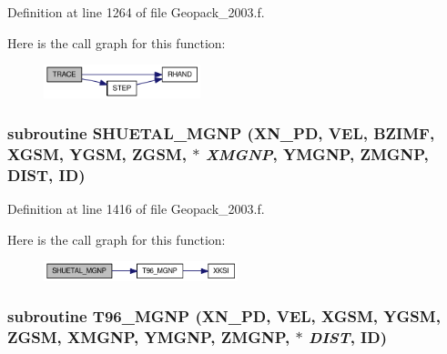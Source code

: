 Definition at line 1264 of file Geopack\_\-2003.f.

Here is the call graph for this function:\nopagebreak
\begin{figure}[H]
\begin{center}
\leavevmode
\includegraphics[width=129pt]{_geopack__2003_8f_e88b362d0d3c99ad9c733e9fc088b731_cgraph}
\end{center}
\end{figure}
\hypertarget{_geopack__2003_8f_3bab20b0a7497f74438bdbad9bd01271}{
\subsubsection[{SHUETAL\_\-MGNP}]{\setlength{\rightskip}{0pt plus 5cm}subroutine SHUETAL\_\-MGNP (XN\_\-PD, \/  VEL, \/  BZIMF, \/  XGSM, \/  YGSM, \/  ZGSM, \/  $\ast$ {\em XMGNP}, \/  YMGNP, \/  ZMGNP, \/  DIST, \/  ID)}}
\label{_geopack__2003_8f_3bab20b0a7497f74438bdbad9bd01271}




Definition at line 1416 of file Geopack\_\-2003.f.

Here is the call graph for this function:\nopagebreak
\begin{figure}[H]
\begin{center}
\leavevmode
\includegraphics[width=160pt]{_geopack__2003_8f_3bab20b0a7497f74438bdbad9bd01271_cgraph}
\end{center}
\end{figure}
\hypertarget{_geopack__2003_8f_eb78a92a9deaca0077c026b5adf32cad}{
\subsubsection[{T96\_\-MGNP}]{\setlength{\rightskip}{0pt plus 5cm}subroutine T96\_\-MGNP (XN\_\-PD, \/  VEL, \/  XGSM, \/  YGSM, \/  ZGSM, \/  XMGNP, \/  YMGNP, \/  ZMGNP, \/  $\ast$ {\em DIST}, \/  ID)}}
\label{_geopack__2003_8f_eb78a92a9deaca0077c026b5adf32cad}




